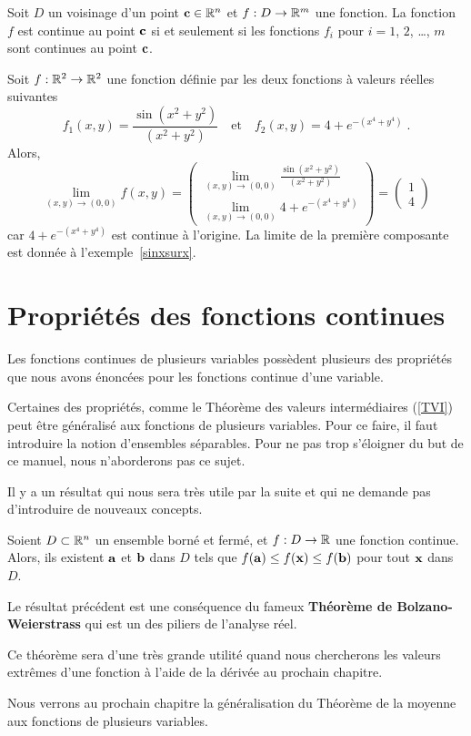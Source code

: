 {\begin{prop}
Soit $D$ un voisinage d'un point $\mathbf{c} \in \mathbb{R}^n$ et
$f:D\rightarrow \mathbb{R}^m$ une fonction.  La fonction $f$ est continue au
point $\mathbf{c}$ si et seulement si les fonctions $f_i$ pour $i=1$,
$2$, \ldots, $m$ sont continues au point $\mathbf{c}$.
\end{prop}

\begin{egg}
Soit $f:\mathbb{R}^2 \rightarrow \mathbb{R}^2$ une fonction définie par les deux
fonctions à valeurs réelles suivantes
\[
f_1(x,y) = \frac{\sin(x^2+y^2)}{(x^2+y^2)}
\quad \text{et} \quad
f_2(x,y) = 4 + e^{-(x^4+y^4)} \; .
\]
Alors,
\[
\lim_{(x,y)\rightarrow (0,0)} f(x,y) =
\begin{pmatrix}
\displaystyle \lim_{(x,y)\rightarrow (0,0)}
\frac{\sin(x^2+y^2)}{(x^2+y^2)} \\[1em]
\displaystyle \lim_{(x,y)\rightarrow (0,0)}
4 + e^{-(x^4+y^4)}
\end{pmatrix}
= \begin{pmatrix} 1 \\ 4 \end{pmatrix}
\]
car $4 + e^{-(x^4+y^4)}$ est continue à l'origine.  La limite de la
première composante est donnée à l'exemple~\ref{sinxsurx}.
\end{egg}

\section{Propriétés des fonctions continues \eng}

Les fonctions continues de plusieurs variables possèdent plusieurs
des propriétés que nous avons énoncées pour les fonctions continue
d'une variable.

Certaines des propriétés, comme le Théorème des valeurs intermédiaires
(\ref{TVI}) peut être généralisé aux fonctions de plusieurs
variables.  Pour ce faire, il faut introduire la notion
d'ensembles séparables.  Pour ne pas trop s'éloigner du but de ce
manuel, nous n'aborderons pas ce sujet.

Il y a un résultat qui nous sera très utile par la suite et qui ne
demande pas d'introduire de nouveaux concepts.

\begin{theorem} \label{TVEnD}
Soient $D \subset \mathbb{R}^n$ un ensemble borné et fermé, et $f:D \to \mathbb{R}$
une fonction continue.  Alors, ils existent $\mathbf{a}$ et $\mathbf{b}$
dans $D$ tels que $f(\mathbf{a}) \leq f(\mathbf{x}) \leq f(\mathbf{b})$ pour
tout $\mathbf{x}$ dans $D$.
\end{theorem}

Le résultat précédent est une conséquence du fameux
{\bfseries Théorème de Bolzano-Weier\-strass} qui est un des piliers de
l'analyse réel.

Ce théorème sera d'une très grande utilité quand nous chercherons les
valeurs extrêmes d'une fonction à l'aide de la dérivée au prochain
chapitre.

Nous verrons au prochain chapitre la généralisation du Théorème de la
moyenne aux fonctions de plusieurs variables.

}  %

